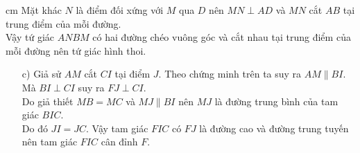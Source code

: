 \begin{bt}
{{
						}
		 cm		
		\noindent	
		Mặt khác  $N$ là điểm đối xứng với $M$ qua $D$ nên $MN\perp AD$ và $MN$ cắt $AB$ tại trung điểm của mỗi đường. \\
		Vậy tứ giác $ANBM$ có hai đường chéo vuông góc và cắt nhau tại trung điểm của mỗi đường nên tứ giác hình thoi.
				\begin{enumerate}
				 \item [c)] Giả sử $AM$ cắt $CI$ tại điểm $J$. Theo chứng minh trên ta suy ra $AM\parallel BI$.\\
				  Mà $BI\perp CI$ suy ra  $FJ\perp CI$.\\
				  Do giả thiết $MB = MC$ và $MJ\parallel BI$ nên $MJ$ là đường trung bình của tam giác $BIC$.\\
				   Do đó $JI = JC$. Vậy tam giác $FIC$ có $FJ$ là đường cao và đường trung tuyến nên tam giác $FIC$ cân đỉnh $F$.
			\end{enumerate}
					}
\end{bt}
